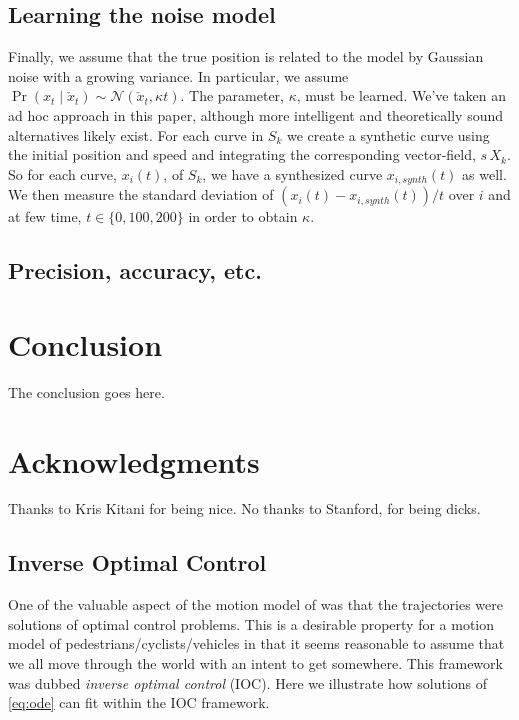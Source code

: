 \documentclass[conference]{IEEEtran}
\begin{document}
  \subsection{Learning the noise model}
  Finally, we assume that the true position is related to the model by Gaussian noise with a growing variance.
  In particular, we assume $\Pr( x_t \mid \check{x}_t) \sim \mathcal{N}( \check{x}_t , \kappa t)$.
  The parameter, $\kappa$, must be learned.
  We've taken an ad hoc approach in this paper, although more intelligent and theoretically sound alternatives likely exist.
  For each curve in $S_k$ we create a synthetic curve using the initial position and speed and integrating the corresponding vector-field, $s\, X_k$.
  So for each curve, $x_i(t)$, of $S_k$, we have a synthesized curve $x_{i,synth}(t)$ as well.
  We then measure the standard deviation of $(x_i(t) - x_{i,synth}(t)) / t$ over $i$ and at few time, $t \in \{ 0, 100, 200 \}$ in order to obtain $\kappa$.
  
 \subsection{ Precision, accuracy, etc.}


\section{Conclusion} 
\label{sec:conclusion}

The conclusion goes here.

\section*{Acknowledgments}
Thanks to Kris Kitani for being nice.  No thanks to Stanford, for being dicks.

\appendix
\subsection{Inverse Optimal Control} \label{app:ioc}
One of the valuable aspect of the motion model of \cite{Kitani2012} was that the trajectories were solutions of optimal control problems.
This is a desirable property for a motion model of pedestrians/cyclists/vehicles in that it seems reasonable to assume that we all move through the world with an intent to get somewhere.
This framework was dubbed \emph{inverse optimal control} (IOC).
Here we illustrate how solutions of \eqref{eq:ode} can fit within the IOC framework.
\end{document}
